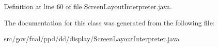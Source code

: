 Definition at line 60 of file Screen\-Layout\-Interpreter.\-java.



The documentation for this class was generated from the following file\-:\begin{DoxyCompactItemize}
\item 
src/gov/fnal/ppd/dd/display/\hyperlink{ScreenLayoutInterpreter_8java}{Screen\-Layout\-Interpreter.\-java}\end{DoxyCompactItemize}
